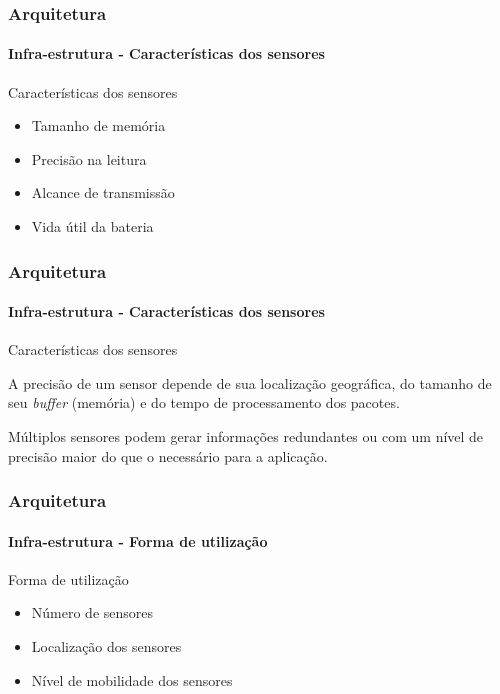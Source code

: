 \documentclass[notes]{beamer}
\begin{document}
\begin{frame}
\label{slide_35}
\frametitle{Arquitetura}
\framesubtitle{Infra-estrutura - Características dos sensores}

\begin{block}{Características dos sensores}

\begin{itemize}

\item Tamanho de memória \pause
\item Precisão na leitura \pause
\item Alcance de transmissão \pause
\item Vida útil da bateria 

\end{itemize}

\end{block}

\end{frame}

\begin{frame}
\label{slide_36}
\frametitle{Arquitetura}
\framesubtitle{Infra-estrutura - Características dos sensores}

\begin{block}{Características dos sensores}

A precisão de um sensor depende de sua localização geográfica, do tamanho de seu \textit{buffer} (memória) e do tempo de processamento dos pacotes. 

\end{block} \pause

\begin{alertblock}

Múltiplos sensores podem gerar informações redundantes ou com um nível de precisão maior do que o necessário para a aplicação. 

\end{alertblock}

\end{frame}

\begin{frame}
\label{slide_37}
\frametitle{Arquitetura}
\framesubtitle{Infra-estrutura - Forma de utilização}

\begin{block}{Forma de utilização}

\begin{itemize}

\item Número de sensores \pause
\item Localização dos sensores \pause
\item Nível de mobilidade dos sensores

\end{itemize}

\end{block}

\end{frame}
\end{document}
